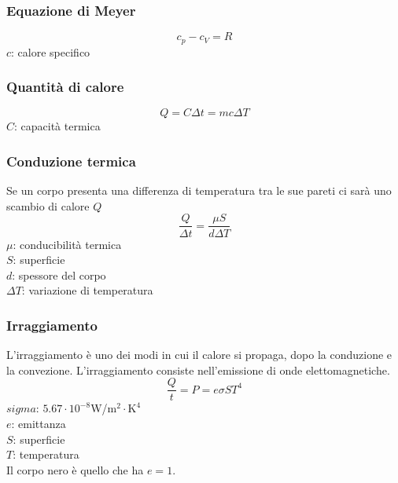 \subsubsection{Equazione di Meyer}
\begin{equation*}
  c_p - c_V = R
\end{equation*}
$c$: calore specifico

\subsubsection{Quantità di calore}
\begin{equation*}
  Q = C\Delta t = mc\Delta T
\end{equation*}
$C$: capacità termica

\subsubsection{Conduzione termica}
\begin{center}
\end{center}
Se un corpo presenta una differenza di temperatura tra le sue pareti ci sarà uno scambio di calore
$Q$
\begin{equation*}
  \frac{Q}{\Delta t} = \frac{\mu S}{d\Delta T}
\end{equation*}
$\mu$: conducibilità termica\\
$S$: superficie\\
$d$: spessore del corpo\\
$\Delta T$: variazione di temperatura

\subsubsection{Irraggiamento}
L'irraggiamento è uno dei modi in cui il calore si propaga, dopo la conduzione e la convezione.
L'irraggiamento consiste nell'emissione di onde elettomagnetiche.
\begin{equation*}
  \frac{Q}{t} = P = e\sigma ST^4
\end{equation*}
\hyperref[tab:sigma]{$sigma$}: $5.67\cdot10^{-8}$W/$\text{m}^2\cdot\text{K}^4$\\
$e$: emittanza\\
$S$: superficie\\
$T$: temperatura\\ [\baselineskip]
Il corpo nero è quello che ha $e=1$.

